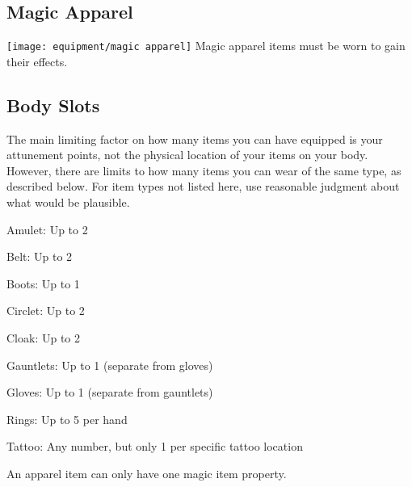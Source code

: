 \begin{longcolumn}
  \section{Magic Apparel}
    \begin{longtablepreface}
      \texttt{[image: equipment/magic apparel]}
      Magic apparel items must be worn to gain their effects.

      \subsection{Body Slots}\label{Body Slots}
        The main limiting factor on how many items you can have equipped is your attunement points, not the physical location of your items on your body.
        However, there are limits to how many items you can wear of the same type, as described below.
        For item types not listed here, use reasonable judgment about what would be plausible.
        \begin{raggeditemize}
          \item Amulet: Up to 2
          \item Belt: Up to 2
          \item Boots: Up to 1
          \item Circlet: Up to 2
          \item Cloak: Up to 2
          \item Gauntlets: Up to 1 (separate from gloves)
          \item Gloves: Up to 1 (separate from gauntlets)
          \item Rings: Up to 5 per hand
          \item Tattoo: Any number, but only 1 per specific tattoo location
        \end{raggeditemize}

       An apparel item can only have one magic item property.
    \end{longtablepreface}

    

\end{longcolumn}



\newpage
{}


